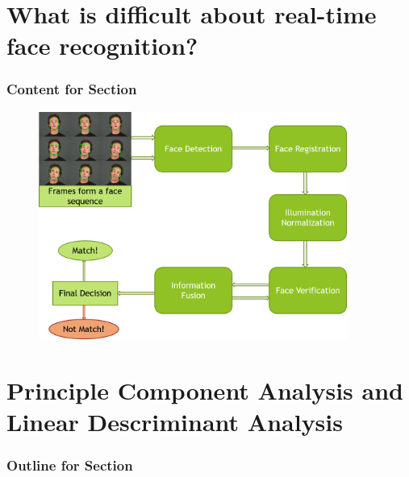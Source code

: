\documentclass[xcolor=dvipsnames]{beamer}
\begin{document}
 
    \section{What is difficult about real-time face recognition?}
    \begin{frame}
      \frametitle{Content for Section \thesection}
      \tableofcontents[currentsection]
    \end{frame}
    

    \begin{frame}
    \begin{figure}[H]
        \graphicspath{{figs/}}
        \includegraphics[width=0.9\textwidth]{img1.png}
    \end{figure}
    \end{frame}
    
    \section{Principle Component Analysis and Linear Descriminant Analysis}
    \begin{frame}
      \frametitle{Outline for Section \thesection}
      \tableofcontents[currentsection]
    \end{frame}
    
\end{document}
